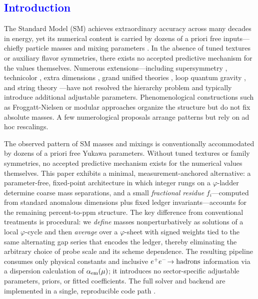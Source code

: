 \documentclass[%
amsmath,amssymb,
aps,
prb,
floatfix,showkeys
]{revtex4-2}
\newcommand{\modif}[1]{\textcolor{blue}{#1}}
\begin{document}
\keywords{{\modif{axiomatic physics, type theory, foundations of physics, logical necessity, tautology, dark matter, cosmology}}}

\maketitle

\onecolumngrid

\modif{\section{Introduction}
\label{sec:introduction}}

The Standard Model (SM) \cite{SM-ref,weinberg-book,Weinberg1979} achieves extraordinary accuracy across many decades in energy, yet its numerical content is carried by dozens of a priori free inputs—chiefly particle masses and mixing parameters \cite{PDG2022,PDG2025}. In the absence of tuned textures or auxiliary flavor symmetries, there exists no accepted predictive mechanism for the values themselves. Numerous extensions—including supersymmetry \cite{dine-1993,Wess1974}, technicolor \cite{Susskind1979,hill-2003,technicolor-2015}, extra dimensions \cite{Randall1999}, grand unified theories \cite{grand-uni-th-2015}, loop quantum gravity \cite{Rovelli2004,loop-qg}, and string theory \cite{polchinski-1998}—have not resolved the hierarchy problem and typically introduce additional adjustable parameters. Phenomenological constructions such as Froggatt-Nielsen \cite{frog-1979,fritz-2000} or modular approaches \cite{petcov} organize the structure but do not fix absolute masses. A few numerological proposals \cite{koide-1983,eln-2002,eln-2002-1,cascade-2003} arrange patterns but rely on ad hoc rescalings.

The observed pattern of SM masses and mixings is conventionally accommodated by dozens of a priori free Yukawa parameters. Without tuned textures or family symmetries, no accepted predictive mechanism exists for the numerical values themselves. This paper exhibits a minimal, measurement-anchored alternative: a parameter-free, fixed-point architecture in which integer rungs on a $\varphi$-ladder determine coarse mass separations, and a small \emph{fractional residue} $f_i$—computed from standard anomalous dimensions plus fixed ledger invariants—accounts for the remaining percent-to-ppm structure. The key difference from conventional treatments is procedural: we \emph{define} masses nonperturbatively as solutions of a local $\varphi$-cycle and then \emph{average} over a $\varphi$-sheet with signed weights tied to the same alternating gap series that encodes the ledger, thereby eliminating the arbitrary choice of probe scale and its scheme dependence. The resulting pipeline consumes only physical constants and inclusive $e^+e^-\!\to{\rm hadrons}$ information via a dispersion calculation of $\alpha_{\rm em}(\mu)$; it introduces no sector-specific adjustable parameters, priors, or fitted coefficients. The full solver and backend are implemented in a single, reproducible code path \cite{EidelmanJegerlehner1995,Jegerlehner2003,Keshavarzi2019,Davier2017,PDG2024}.
\end{document}
